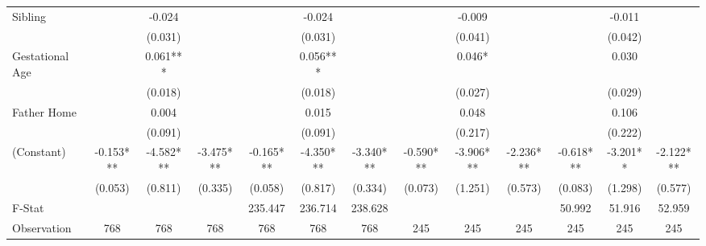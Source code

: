 \begin{tabular}{lcccccccccccc}
Sibling &  & -0.024 &  &  & -0.024 &  &  & -0.009 &  &  & -0.011 &  \\
 &  & (0.031) &  &  & (0.031) &  &  & (0.041) &  &  & (0.042) &  \\
Gestational Age &  & 0.061*** &  &  & 0.056*** &  &  & 0.046* &  &  & 0.030 &  \\
 &  & (0.018) &  &  & (0.018) &  &  & (0.027) &  &  & (0.029) &  \\
Father Home &  & 0.004 &  &  & 0.015 &  &  & 0.048 &  &  & 0.106 &  \\
 &  & (0.091) &  &  & (0.091) &  &  & (0.217) &  &  & (0.222) &  \\
(Constant) & -0.153*** & -4.582*** & -3.475*** & -0.165*** & -4.350*** & -3.340*** & -0.590*** & -3.906*** & -2.236*** & -0.618*** & -3.201** & -2.122*** \\
 & (0.053) & (0.811) & (0.335) & (0.058) & (0.817) & (0.334) & (0.073) & (1.251) & (0.573) & (0.083) & (1.298) & (0.577) \\
\midrule 
F-Stat &  &  &  & 235.447 & 236.714 & 238.628 &  &  &  & 50.992 & 51.916 & 52.959 \\
Observation & 768 & 768 & 768 & 768 & 768 & 768 & 245 & 245 & 245 & 245 & 245 & 245 \\
\midrule 
\bottomrule 
\end{tabular}
